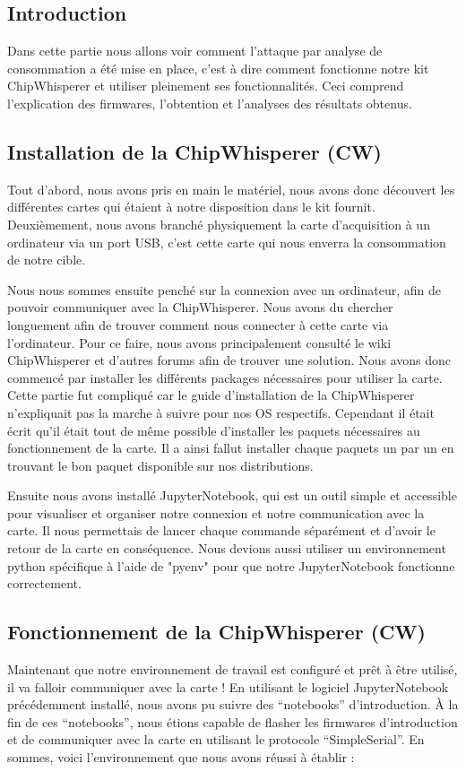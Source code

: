 \subsection{Introduction}
Dans cette partie nous allons voir comment l'attaque par analyse de consommation a été mise en place, c'est à dire comment fonctionne notre kit ChipWhisperer et utiliser pleinement ses fonctionnalités. Ceci comprend l'explication des firmwares, l'obtention et l'analyses des résultats obtenus.

\subsection{Installation de la ChipWhisperer (CW)}
Tout d'abord, nous avons pris en main le matériel, nous avons donc découvert les différentes cartes qui étaient à notre disposition dans le kit fournit.
Deuxièmement, nous avons branché physiquement la carte d'acquisition à un ordinateur via un port USB, c'est cette carte qui nous enverra la consommation de notre cible.

Nous nous sommes ensuite penché sur la connexion avec un ordinateur, afin de pouvoir communiquer avec la ChipWhisperer. Nous avons du chercher longuement afin de trouver comment nous connecter à cette carte via l'ordinateur. Pour ce faire, nous avons principalement consulté le wiki ChipWhisperer \cite{chip:rtd} et d'autres forums afin de trouver une solution. 
Nous avons donc commencé par installer les différents packages nécessaires pour utiliser la carte. Cette partie fut compliqué car le guide d'installation de la ChipWhisperer n'expliquait pas la marche à suivre pour nos OS respectifs. Cependant il était écrit qu'il était tout de même possible d'installer les paquets nécessaires au fonctionnement de la carte. Il a ainsi fallut installer chaque paquets un par un en trouvant le bon paquet disponible sur nos distributions. 

Ensuite nous avons installé JupyterNotebook, qui est un outil simple et accessible pour visualiser et organiser notre connexion et notre communication avec la carte. 
Il nous permettais de lancer chaque commande séparément et d'avoir le retour de la carte en conséquence.
Nous devions aussi utiliser un environnement python spécifique à l'aide de "pyenv" pour que notre JupyterNotebook fonctionne correctement.

\subsection{Fonctionnement de la ChipWhisperer (CW)}
Maintenant que notre environnement de travail est configuré et prêt à être utilisé, il va falloir communiquer avec la carte ! En utilisant le logiciel JupyterNotebook précédemment installé, nous avons pu suivre des ``notebooks'' d'introduction. À la fin de ces ``notebooks'', nous étions capable de flasher les firmwares d'introduction et de communiquer avec la carte en utilisant le protocole ``SimpleSerial''. En sommes, voici l'environnement que nous avons réussi à établir :


